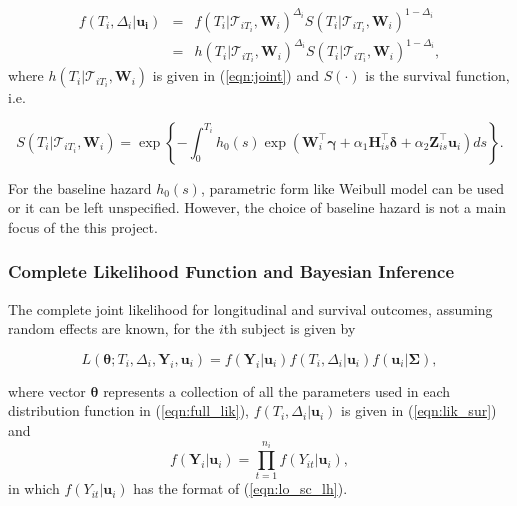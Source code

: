 \begin{eqnarray}\label{eqn:survival_like}\label{eqn:lik_sur}
f(T_i, \Delta_i|\boldsymbol{u_i})&=&f(T_i|\mathcal{T}_{iT_i}, \boldsymbol{W}_i)^{\Delta_i}S(T_i|\mathcal{T}_{iT_i}, \boldsymbol{W}_i)^{1-\Delta_i}\\
&=&\nonumber h(T_i|\mathcal{T}_{iT_i}, \boldsymbol{W}_i)^{\Delta_i}S(T_i|\mathcal{T}_{iT_i}, \boldsymbol{W}_i)^{1-\Delta_i},
\end{eqnarray}
where $h(T_i|\mathcal{T}_{iT_i}, \boldsymbol{W}_i)$ is given in (\ref{eqn:joint}) and $S(\cdot)$ is the survival function, i.e.

\begin{equation}\label{eqn:survival}
S(T_i|\mathcal{T}_{iT_i}, \boldsymbol{W}_i)=\exp\left\{-\int_0^{T_i}h_0(s)\exp({\boldsymbol W}_i^{\top}\boldsymbol{\gamma} + \alpha_1{\boldsymbol H}_{is} ^{\top}\boldsymbol{\delta}+ \alpha_2{\boldsymbol Z}_{is}^{\top}{\boldsymbol u}_i)ds\right\}.
\end{equation}

For the baseline hazard $h_0(s)$, parametric form like Weibull model can be used or it can be left unspecified. However, the choice of baseline hazard is not a main focus of the this project.



\subsubsection{Complete Likelihood Function and Bayesian Inference}\label{sec:estimation}


The complete joint likelihood for longitudinal and survival outcomes, assuming random effects are known, for the $i$th subject is given by

\begin{equation}\label{eqn:full_lik}
L(\boldsymbol{\theta};T_i, \Delta_i, \boldsymbol{Y}_i, \boldsymbol{u}_i) = f(\boldsymbol{Y}_i|\boldsymbol{u}_i)f(T_i, \Delta_i|\boldsymbol{u}_i)f(\boldsymbol{u}_i|\boldsymbol{\Sigma}),
\end{equation}

where vector $\boldsymbol{\theta}$ represents a collection of all the parameters used in each distribution function in (\ref{eqn:full_lik}),  $f(T_i, \Delta_i|\boldsymbol{u}_i)$ is given in (\ref{eqn:lik_sur}) and 
\[f(\boldsymbol{Y}_i|\boldsymbol{u}_i)=\prod_{t=1}^{n_i}f(Y_{it}|\boldsymbol{u}_i),\]
in which $f(Y_{it}|\boldsymbol{u}_i)$ has the format of (\ref{eqn:lo_sc_lh}).

